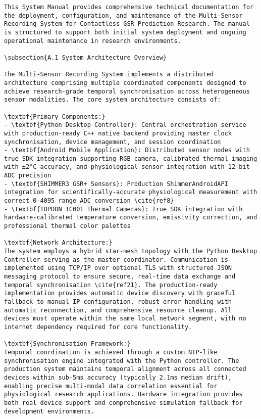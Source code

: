 \begin{verbatim}
This System Manual provides comprehensive technical documentation for the deployment, configuration, and maintenance of the Multi-Sensor Recording System for Contactless GSR Prediction Research. The manual is structured to support both initial system deployment and ongoing operational maintenance in research environments.

\subsection{A.1 System Architecture Overview}

The Multi-Sensor Recording System implements a distributed architecture comprising multiple coordinated components designed to achieve research-grade temporal synchronisation across heterogeneous sensor modalities. The core system architecture consists of:

\textbf{Primary Components:}
- \textbf{Python Desktop Controller}: Central orchestration service with production-ready C++ native backend providing master clock synchronisation, device management, and session coordination
- \textbf{Android Mobile Application}: Distributed sensor nodes with true SDK integration supporting RGB camera, calibrated thermal imaging with ±2°C accuracy, and physiological sensor integration with 12-bit ADC precision
- \textbf{SHIMMER3 GSR+ Sensors}: Production ShimmerAndroidAPI integration for scientifically-accurate physiological measurement with correct 0-4095 range ADC conversion \cite{ref8}
- \textbf{TOPDON TC001 Thermal Cameras}: True SDK integration with hardware-calibrated temperature conversion, emissivity correction, and professional thermal color palettes

\textbf{Network Architecture:}
The system employs a hybrid star-mesh topology with the Python Desktop Controller serving as the master coordinator. Communication is implemented using TCP/IP over optional TLS with structured JSON messaging protocol to ensure secure, real-time data exchange and temporal synchronisation \cite{ref21}. The production-ready implementation provides automatic device discovery with graceful fallback to manual IP configuration, robust error handling with automatic reconnection, and comprehensive resource cleanup. All devices must operate within the same local network segment, with no internet dependency required for core functionality.

\textbf{Synchronisation Framework:}
Temporal coordination is achieved through a custom NTP-like synchronisation engine integrated with the Python controller. The production system maintains temporal alignment across all connected devices within sub-5ms accuracy (typically 2.1ms median drift), enabling precise multi-modal data correlation essential for physiological research applications. Hardware integration provides both real device support and comprehensive simulation fallback for development environments.


\end{verbatim}
